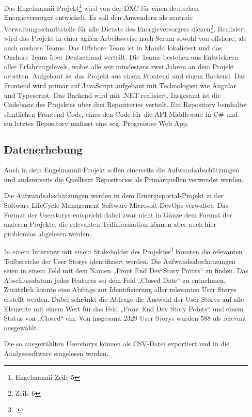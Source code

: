 Das Engelmannii Projekt\footnote{Engelmannii Zeile 5} wird von der
DXC für einen deutschen Energieversorger entwickelt. Es soll den
Anwendern als zentrale Verwaltungsschnittstelle für alle Dienste des
Energieversorgers dienen\footnote{Zeile 6}. Realisiert wird das Projekt
in einer agilen Arbeitsweise nach Scrum sowohl von offshore, als auch
onshore Teams. Das Offshore Team ist in Manila lokalisiert und das
Onshore Team über Deutschland verteilt. Die Teams bestehen aus
Entwicklern aller Erfahrungslevels, wobei alle seit mindestens zwei
Jahren an dem Projekt arbeiten. Aufgebaut ist das Projekt aus einem
Frontend und einem Backend. Das Frontend wird primär auf JavaScript
aufgebaut mit Technologien wie Angular und Typescript. Das Backend wird
mit .NET realisiert. Insgesamt ist die Codebasis des Projektes über drei
Repositories verteilt. Ein Repository beinhaltet sämtlichen Frontend
Code, eines den Code für die API Middleware in C\# und ein letztes
Repository umfasst eine sog. Progressive Web App.

\subsection{Datenerhebung}\label{engelmannii-Datenerhebung}

Auch in dem Engelmannii-Projekt sollen einerseits die
Aufwandsabschätzungen und andererseits die Quelltext Repositories als
Primärquellen verwendet werden.

Die Aufwandsabschätzungen werden in dem Ernergieportal-Projekt in der
Software LifeCycle Management Software Microsoft DevOps verwaltet. Das
Format der Userstorys entspricht dabei zwar nicht in Gänze dem Format
der anderen Projekte, die relevanten Teilinformation können aber auch
hier problemlos abgelesen werden.

In einem Interview mit einem Stakeholder des Projektes\footcite[Vgl. ][]{Quelle}
konnten die relevanten Teilbereiche der User Storys identifiziert
werden. Die Aufwandsabschätzungen seien in einem Feld mit dem Namen
„Front End Dev Story Points`` zu finden. Das Abschlussdatum jedes
Features sei dem Feld „Closed Date`` zu entnehmen. Zusätzlich konnte
eine Abfrage zur Identifizierung aller relevanten User Storys erstellt
werden. Dabei schränkt die Abfrage die Auswahl der User Storys auf alle
Elemente mit einem Wert für das Feld „Front End Dev Story Points`` und
einem Status von „Closed`` ein. Von insgesamt 2329 User Storys wurden
588 als relevant ausgewählt.

Die so ausgewählten Userstorys können als CSV-Datei exportiert und in
die Analysesoftware eingelesen werden.

